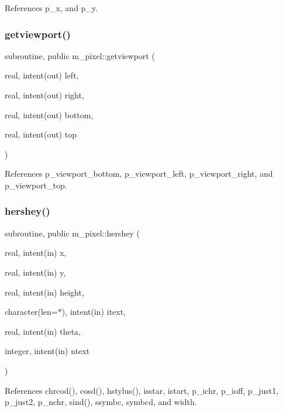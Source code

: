 References p\+\_\+x, and p\+\_\+y.

\mbox{\label{namespacem__pixel_a9f382cf8d3b69e11d1fdd2f2a4f59dea}} 
\subsubsection{\texorpdfstring{getviewport()}{getviewport()}}
{\footnotesize\ttfamily subroutine, public m\+\_\+pixel\+::getviewport (\begin{DoxyParamCaption}\item[{real, intent(out)}]{left,  }\item[{real, intent(out)}]{right,  }\item[{real, intent(out)}]{bottom,  }\item[{real, intent(out)}]{top }\end{DoxyParamCaption})}



References p\+\_\+viewport\+\_\+bottom, p\+\_\+viewport\+\_\+left, p\+\_\+viewport\+\_\+right, and p\+\_\+viewport\+\_\+top.

\mbox{\label{namespacem__pixel_a80dc3cb149287470a9837de8dd3f05bc}} 
\subsubsection{\texorpdfstring{hershey()}{hershey()}}
{\footnotesize\ttfamily subroutine, public m\+\_\+pixel\+::hershey (\begin{DoxyParamCaption}\item[{real, intent(in)}]{x,  }\item[{real, intent(in)}]{y,  }\item[{real, intent(in)}]{height,  }\item[{character(len=$\ast$), intent(in)}]{itext,  }\item[{real, intent(in)}]{theta,  }\item[{integer, intent(in)}]{ntext }\end{DoxyParamCaption})}



References chrcod(), cosd(), hstylus(), isstar, istart, p\+\_\+ichr, p\+\_\+ioff, p\+\_\+just1, p\+\_\+just2, p\+\_\+nchr, sind(), ssymbc, symbcd, and width.

